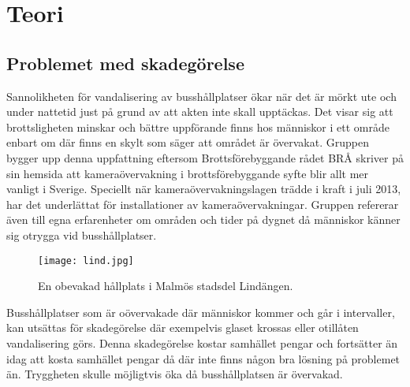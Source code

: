 
\chapter{Teori} %
\label{teori}

\ifpdf
    \graphicspath{{3_theory/figures/PNG/}{3/figures/PDF/}{3/figures/}}
\else
    \graphicspath{{3_theory/figures/EPS/}{3/figures/}}
\fi

\graphicspath{{3_theory/figures/}{3/figures/}}


\section{Problemet med skadegörelse}

Sannolikheten för vandalisering av busshållplatser ökar när det är mörkt ute och under nattetid just på grund av att akten inte skall upptäckas. Det visar sig att brottsligheten minskar och bättre uppförande finns hos människor i ett område enbart om där finns en skylt som säger att området är övervakat. Gruppen bygger upp denna uppfattning eftersom Brottsförebyggande rådet BRÅ skriver på sin hemsida att kameraövervakning i brottsförebyggande syfte blir allt mer vanligt i Sverige. Speciellt när kameraövervakningslagen trädde i kraft i juli 2013, har det underlättat för installationer av kameraövervakningar. Gruppen refererar även till egna erfarenheter om områden och tider på dygnet då människor känner sig otrygga vid busshållplatser. 

\begin{figure}[h]
  \texttt{[image: lind.jpg]}
  \caption{En obevakad hållplats i Malmös stadsdel Lindängen.}
  \label{fig:lind}
\end{figure}

Busshållplatser som är oövervakade där människor kommer och går i intervaller, kan utsättas för skadegörelse där exempelvis glaset krossas eller otillåten vandalisering görs. Denna skadegörelse kostar samhället pengar och fortsätter än idag att kosta samhället pengar då där inte finns någon bra lösning på problemet än. Tryggheten skulle möjligtvis öka då busshållplatsen är övervakad.\\


